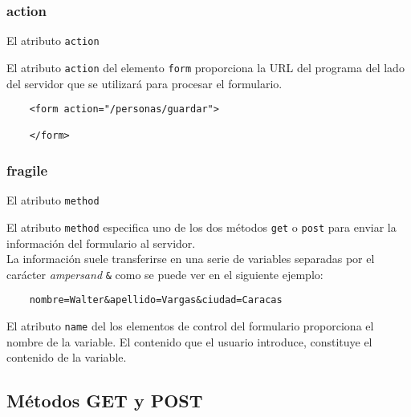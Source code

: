 \documentclass{beamer}
\begin{document}
\subsubsection{action} 

\begin{frame}[fragile]{El atributo \texttt{action}} %
\begin{center}
    
    El atributo \texttt{action} del elemento \texttt{form} proporciona la URL
    del programa del lado del servidor que se utilizará para procesar el
    formulario.
    
    \begin{lstlisting}
    <form action="/personas/guardar">

    </form>
    \end{lstlisting}

\end{center}
\end{frame}

\subsubsection{fragile} 

\begin{frame}[fragile]{El atributo \texttt{method}} %
\begin{center}
    
    El atributo \texttt{method} especifica uno de los dos métodos \texttt{get}
    o \texttt{post} para enviar la información del formulario al servidor.
    \\[0.4cm]
    \pause
    La información suele transferirse en una serie de variables separadas por
    el carácter \textit{ampersand} \texttt{\&} como se puede ver en el siguiente
    ejemplo: 

    \begin{verbatim}
    nombre=Walter&apellido=Vargas&ciudad=Caracas
    \end{verbatim}
    \pause
    El atributo \texttt{name} del los elementos de control del formulario
    proporciona el nombre de la variable. El contenido que el usuario
    introduce, constituye el contenido de la variable.

\end{center}
\end{frame}

\subsection{Métodos GET y POST} %
\end{document}
